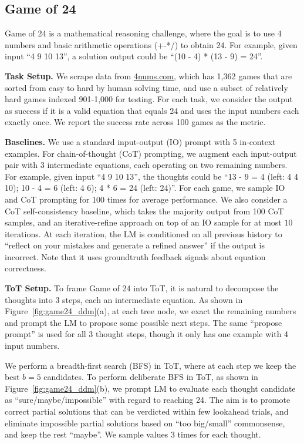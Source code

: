 \subsection{Game of 24}

Game of 24 is a mathematical reasoning challenge, where the goal is to use 4 numbers and basic arithmetic operations (+-*/) to obtain 24. For example, given input ``4 9 10 13'', a solution output could be ``(10 - 4) * (13 - 9) = 24''. 

\textbf{Task Setup.} We scrape data from \href{https://www.4nums.com/game/difficulties/}{4nums.com}, which has 1,362 games that are sorted from easy to hard by human solving time, and use a subset of relatively hard games indexed 901-1,000 for testing. For each task, we consider the output as success if it is a valid equation that equals 24 and uses the input numbers each exactly once. We report the success rate across 100 games as the metric.

\textbf{Baselines.} We use a standard input-output (IO) prompt with 5 in-context examples. For chain-of-thought (CoT) prompting, we augment each input-output pair with 3 intermediate equations, each operating on two remaining numbers. For example, given input ``4 9 10 13'', the thoughts could be ``13 - 9 = 4 (left: 4 4 10); 10 - 4 = 6 (left: 4 6); 4 * 6 = 24 (left: 24)''. For each game, we sample IO and CoT prompting for 100 times for average performance. We also consider a CoT self-consistency baseline, which takes the majority output from 100 CoT samples, and an iterative-refine approach on top of an IO sample for at most $10$ iterations. At each iteration, the LM is conditioned on all previous history to ``reflect on your mistakes and generate a refined answer'' if the output is incorrect. Note that it uses groundtruth feedback signals about equation correctness.

\textbf{ToT Setup.} To frame Game of 24 into ToT, it is natural to decompose the thoughts into 3 steps, each an intermediate equation. As shown in Figure~\ref{fig:game24_ddm}(a), at each tree node, we exact the remaining numbers and prompt the LM to propose some possible next steps. The same ``propose prompt'' is used for all 3 thought steps, though it only has one example with 4 input numbers. 

We perform a breadth-first search (BFS) in ToT, where at each step we keep the best $b=5$ candidates. To perform deliberate BFS in ToT, as shown in Figure~\ref{fig:game24_ddm}(b), we prompt LM to evaluate each thought candidate as ``sure/maybe/impossible'' with regard to reaching 24. The aim is to promote correct partial solutions that can be verdicted within few lookahead trials, and eliminate impossible partial solutions based on ``too big/small'' commonsense, and keep the rest ``maybe''. We sample values $3$ times for each thought. 

